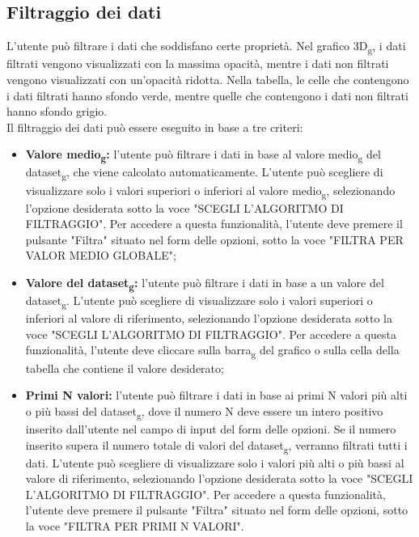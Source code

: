 \subsection{Filtraggio dei dati}
L'utente può filtrare i dati che soddisfano certe proprietà. Nel grafico 3D\textsubscript{g}, i
dati filtrati vengono visualizzati con la massima opacità, mentre i dati non
filtrati vengono visualizzati con un'opacità ridotta. Nella tabella, le celle
che contengono i dati filtrati hanno sfondo verde, mentre quelle che contengono
i dati non filtrati hanno sfondo grigio. \\ Il filtraggio dei dati può essere
eseguito in base a tre criteri:
\begin{itemize}
    \item \textbf{Valore medio\textsubscript{g}:} l'utente può filtrare i dati in base al valore
          medio\textsubscript{g} del dataset\textsubscript{g}, che viene calcolato automaticamente. L'utente può
          scegliere di visualizzare solo i valori superiori o inferiori al valore
          medio\textsubscript{g}, selezionando l'opzione desiderata sotto la voce "SCEGLI
          L'ALGORITMO DI FILTRAGGIO". Per accedere a questa funzionalità, l'utente
          deve premere il pulsante "Filtra" situato nel
          form delle opzioni, sotto la voce "FILTRA PER VALOR MEDIO GLOBALE";
    \item \textbf{Valore del dataset\textsubscript{g}:} l'utente può filtrare i dati in base a un
          valore del dataset\textsubscript{g}. L'utente
          può scegliere di visualizzare solo i valori superiori o inferiori al
          valore di riferimento, selezionando l'opzione desiderata sotto la voce
          "SCEGLI L'ALGORITMO DI FILTRAGGIO". Per accedere a questa funzionalità,
          l'utente deve cliccare sulla barra\textsubscript{g} del grafico o sulla cella della tabella che contiene il
          valore desiderato;
    \item \textbf{Primi N valori:} l'utente può filtrare i dati in base ai primi N
          valori più alti o più bassi del dataset\textsubscript{g}, dove il numero N deve essere un intero positivo
          inserito dall'utente nel campo di input del form delle opzioni. Se il numero inserito supera il numero totale di valori
          del dataset\textsubscript{g}, verranno filtrati tutti i dati. L'utente può scegliere di visualizzare solo i valori
          più alti o più bassi al valore di riferimento, selezionando l'opzione
          desiderata sotto la voce "SCEGLI L'ALGORITMO DI FILTRAGGIO". Per accedere a questa funzionalità,
          l'utente deve premere il pulsante "Filtra" situato nel form delle
          opzioni, sotto la voce "FILTRA PER PRIMI N VALORI".
\end{itemize}
